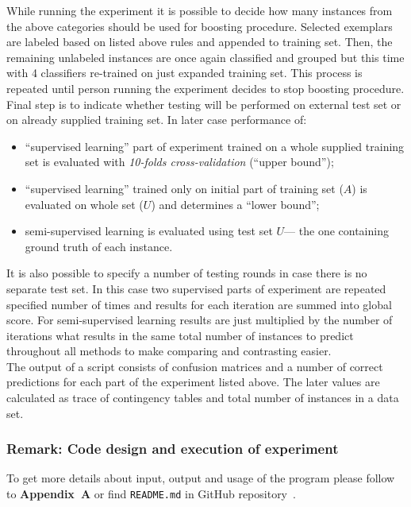 \documentclass[12pt, a4paper, pdflatex]{report}
\begin{document}
While running the experiment it is possible to decide how many instances from the above categories should be used for boosting procedure. Selected exemplars are labeled based on listed above rules and appended to training set. Then, the remaining unlabeled instances are once again classified and grouped but this time with 4 classifiers re-trained on just expanded training set. This process is repeated until person running the experiment decides to stop boosting procedure.\\

Final step is to indicate whether testing will be performed on external test set or on already supplied training set. 
In later case performance of:
\begin{itemize}
\item ``supervised learning'' part of experiment trained on a whole supplied training set is evaluated with \emph{10-folds cross-validation} (``upper bound'');
\item ``supervised learning'' trained only on initial part of training set ($A$) is evaluated on whole set ($U$) and determines a ``lower bound'';
\item semi-supervised learning is evaluated using test set $U$--- the one containing ground truth of each instance.
\end{itemize}

It is also possible to specify a number of testing rounds in case there is no separate test set. In this case two supervised parts of experiment are repeated specified number of times and results for each iteration are summed into global score. For semi-supervised learning results are just multiplied by the number of iterations what results in the same total number of instances to predict throughout all methods to make comparing and contrasting easier.\\

The output of a script consists of confusion matrices and a number of correct predictions for each part of the experiment listed above. The later values are calculated as trace of contingency tables and total number of instances in a data set.

\subsubsection{Remark: Code design and execution of experiment}
To get more details about input, output and usage of the program please follow to \textbf{Appendix~A} or find \texttt{README.md} in GitHub repository~\cite{githubcode}.
\end{document}
